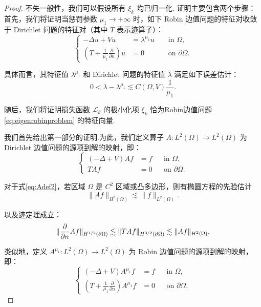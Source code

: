 \begin{proof}
不失一般性，我们可以假设所有 $\xi_{k}$ 均已归一化.
证明主要包含两个步骤：
首先，我们将证明当惩罚参数 $\mu_1 \to +\infty$ 时，如下 Robin 边值问题的特征对收敛于 Dirichlet 问题的特征对（其中 $T$ 表示迹算子）：
\begin{equation}\label{eq:eigenrobinproblem}
\left\{\begin{aligned}
-\Delta u+V u &=\lambda^{\mu_{1}} u & & \text { in } \Omega, \\
\left(T + \frac{1}{\mu_{1}}\frac{\partial}{\partial n}\right) u &=0 & & \text { on } \partial \Omega.
\end{aligned}\right.
\end{equation}

具体而言，其特征值 $\lambda^{\mu_1}$ 和 Dirichlet 问题的特征值 $\lambda$ 满足如下误差估计：
\begin{equation*}
0<\lambda-\lambda^{\mu_{1}}\lesssim C(\Omega,V)\frac{1}{\mu_{1}}.
\end{equation*}

随后，我们将证明损失函数 $\mathcal{L}_k$ 的极小化项 $\xi_{k}$ 恰为Robin边值问题 \eqref{eq:eigenrobinproblem} 的特征向量.

我们首先给出第一部分的证明.为此，我们定义算子 $A: L^{2}(\Omega) \to L^{2}(\Omega)$ 为 Dirichlet 边值问题的源项到解的映射，即：
\begin{equation}\label{eq:Adef2}
\left\{\begin{aligned}
(-\Delta+V) Af &= f & &\text{in } \Omega, \\
TAf &= 0 & &\text{on } \partial\Omega.
\end{aligned}\right.
\end{equation}

对于式\eqref{eq:Adef2}，若区域 $\Omega$ 是 $C^2$ 区域或凸多边形，则有椭圆方程的先验估计
\begin{equation}\label{eq:prior}
\|Af\|_{H^2(\Omega)} \lesssim \|f\|_{L^2(\Omega)}.
\end{equation}

以及迹定理成立：
\begin{equation}\label{eq:trace}
\|\frac{\partial }{\partial n}Af\|_{H^{1/2}(\partial \Omega)} \lesssim \|TAf\|_{H^{3/2}(\partial \Omega)} \lesssim \|Af\|_{H^2(\Omega)}.\\
\end{equation}

类似地，定义 $A^{\mu_{1}}: L^{2}(\Omega) \to L^{2}(\Omega)$ 为 Robin 边值问题的源项到解的映射，即：
\begin{equation}\label{eq:Adef}
\left\{\begin{aligned}
(-\Delta+V) A^{\mu_{1}}f &= f & &\text{in } \Omega, \\
\left(T+\frac{1}{\mu_{1}}\frac{\partial }{\partial n}\right)A^{\mu_{1}}f &= 0 & &\text{on } \partial\Omega,
\end{aligned}\right.
\end{equation}


\end{proof}
